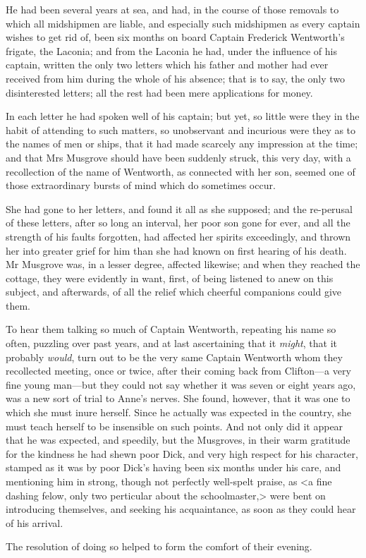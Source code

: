 He had been several years at sea, and had, in the course of those removals to which all midshipmen are liable, and especially such midshipmen as every captain wishes to get rid of, been six months on board Captain Frederick Wentworth's frigate, the Laconia; and from the Laconia he had, under the influence of his captain, written the only two letters which his father and mother had ever received from him during the whole of his absence; that is to say, the only two disinterested letters; all the rest had been mere applications for money.

In each letter he had spoken well of his captain; but yet, so little were they in the habit of attending to such matters, so unobservant and incurious were they as to the names of men or ships, that it had made scarcely any impression at the time; and that Mrs Musgrove should have been suddenly struck, this very day, with a recollection of the name of Wentworth, as connected with her son, seemed one of those extraordinary bursts of mind which do sometimes occur.

She had gone to her letters, and found it all as she supposed; and the re-perusal of these letters, after so long an interval, her poor son gone for ever, and all the strength of his faults forgotten, had affected her spirits exceedingly, and thrown her into greater grief for him than she had known on first hearing of his death. Mr Musgrove was, in a lesser degree, affected likewise; and when they reached the cottage, they were evidently in want, first, of being listened to anew on this subject, and afterwards, of all the relief which cheerful companions could give them.

To hear them talking so much of Captain Wentworth, repeating his name so often, puzzling over past years, and at last ascertaining that it \textit{might}, that it probably \textit{would}, turn out to be the very same Captain Wentworth whom they recollected meeting, once or twice, after their coming back from Clifton—a very fine young man—but they could not say whether it was seven or eight years ago, was a new sort of trial to Anne's nerves. She found, however, that it was one to which she must inure herself. Since he actually was expected in the country, she must teach herself to be insensible on such points. And not only did it appear that he was expected, and speedily, but the Musgroves, in their warm gratitude for the kindness he had shewn poor Dick, and very high respect for his character, stamped as it was by poor Dick's having been six months under his care, and mentioning him in strong, though not perfectly well-spelt praise, as <a fine dashing felow, only two perticular about the schoolmaster,> were bent on introducing themselves, and seeking his acquaintance, as soon as they could hear of his arrival.

The resolution of doing so helped to form the comfort of their evening.